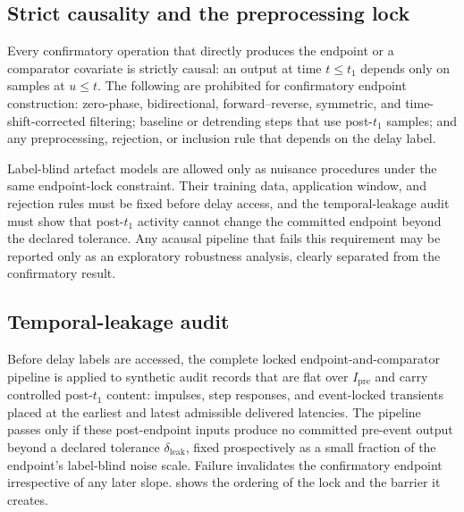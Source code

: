 \documentclass[11pt,a4paper]{article}
\theoremstyle{definition}
\begin{document}
\subsection{Strict causality and the preprocessing lock}
\label{sec:si-causality}

Every confirmatory operation that directly produces the endpoint or a comparator
covariate is strictly causal: an output at time \(t\le t_1\) depends only on
samples at \(u\le t\). The following are prohibited for confirmatory endpoint
construction: zero-phase, bidirectional, forward--reverse, symmetric, and
time-shift-corrected filtering; baseline or detrending steps that use
post-\(t_1\) samples; and any preprocessing, rejection, or inclusion rule that
depends on the delay label.

Label-blind artefact models are allowed only as nuisance procedures under the
same endpoint-lock constraint. Their training data, application window, and
rejection rules must be fixed before delay access, and the temporal-leakage audit
must show that post-\(t_1\) activity cannot change the committed endpoint beyond
the declared tolerance. Any acausal pipeline that fails this requirement may be
reported only as an exploratory robustness analysis, clearly separated from the
confirmatory result.

\subsection{Temporal-leakage audit}
\label{sec:si-leakage-audit}

Before delay labels are accessed, the complete locked endpoint-and-comparator
pipeline is applied to synthetic audit records that are flat over
\(I_{\mathrm{pre}}\) and carry controlled post-\(t_1\) content: impulses, step
responses, and event-locked transients placed at the earliest and latest
admissible delivered latencies. The pipeline passes only if these post-endpoint
inputs produce no committed pre-event output beyond a declared tolerance
\(\delta_{\mathrm{leak}}\), fixed prospectively as a small fraction of the
endpoint's label-blind noise scale. Failure invalidates the confirmatory endpoint
irrespective of any later slope.  shows the ordering of the
lock and the barrier it creates.
\end{document}
